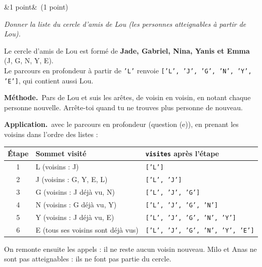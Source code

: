 \documentclass[11pt, a4paper]{exam}
\newcommand{\code}[1]{\texttt{#1}}
\newcommand{\Q}[3]{\par\needspace{5\baselineskip}\bigskip\noindent{\large\bfseries Question #1}\ifx&#2&\else\ \textnormal{(#2)}\fi\par\nopagebreak\smallskip\noindent\textit{#3}\par\nopagebreak\smallskip}
\newcommand{\methode}{\par\noindent\textbf{Méthode.}\ }
\newcommand{\application}{\par\noindent\textbf{Application.}\ }
\begin{document}
\Q{3 (d)}{1 point}{Donner la liste du cercle d'amis de Lou (les personnes atteignables à partir de Lou).}
\begin{reponse}
Le cercle d'amis de Lou est formé de \textbf{Jade, Gabriel, Nina, Yanis et Emma} (J, G, N, Y, E). \\
Le parcours en profondeur à partir de \code{'L'} renvoie \code{['L', 'J', 'G', 'N', 'Y', 'E']}, qui contient aussi Lou.
\end{reponse}
\methode Pars de Lou et suis les arêtes, de voisin en voisin, en notant chaque personne nouvelle. Arrête-toi quand tu ne trouves plus personne de nouveau.

\application avec le parcours en profondeur (question (e)), en prenant les voisins dans l'ordre des listes :
\begin{center}
\renewcommand{\arraystretch}{1.15}
\begin{tabular}{|c|l|l|}
\hline
\textbf{Étape} & \textbf{Sommet visité} & \textbf{\code{visites} après l'étape} \\ \hline
1 & L (voisins : J) & \code{['L']} \\
2 & J (voisins : G, Y, E, L) & \code{['L', 'J']} \\
3 & G (voisins : J déjà vu, N) & \code{['L', 'J', 'G']} \\
4 & N (voisins : G déjà vu, Y) & \code{['L', 'J', 'G', 'N']} \\
5 & Y (voisins : J déjà vu, E) & \code{['L', 'J', 'G', 'N', 'Y']} \\
6 & E (tous ses voisins sont déjà vus) & \code{['L', 'J', 'G', 'N', 'Y', 'E']} \\ \hline
\end{tabular}
\end{center}
On remonte ensuite les appels : il ne reste aucun voisin nouveau. Milo et Anas ne sont pas atteignables : ils ne font pas partie du cercle.
\end{document}
